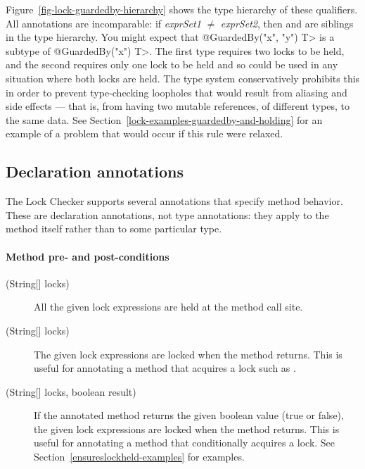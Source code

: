 Figure~\ref{fig-lock-guardedby-hierarchy} shows the type hierarchy of these
qualifiers.
All  annotations are incomparable:
if \emph{exprSet1} $\neq$ \emph{exprSet2}, then  and
 are siblings in the type hierarchy.
You might expect that
\<@GuardedBy({"x", "y"}) T> is a subtype of \<@GuardedBy({"x"}) T>.  The
first type requires two locks to be held, and the second requires only one
lock to be held and so could be used in any situation where both locks are
held.  The type system conservatively prohibits this in order to prevent
type-checking loopholes that would result from aliasing and side effects
--- that is, from having two mutable references, of different types, to the
same data. See
Section~\ref{lock-examples-guardedby-and-holding} for an example
of a problem that would occur if this rule were relaxed.


\subsection{Declaration annotations\label{lock-declaration-annotations}}

The Lock Checker supports several annotations that specify method behavior.
These are declaration annotations, not type annotations: they apply to the
method itself rather than to some particular type.

\paragraph{Method pre- and post-conditions}

\begin{description}
\item[\small{(String[] locks)}]
  All the given lock expressions
  are held at the method call site.

\item[\small{(String[] locks)}]
  The given lock
  expressions are
  locked when the method returns.  This is useful for annotating a
  method that acquires a lock such as
  .

\item[\small{(String[] locks, boolean result)}]
  If the annotated method returns the given
  boolean value (true or false), the given lock
  expressions are locked when the method returns.
  This is useful for annotating a
  method that conditionally acquires a lock.
  See Section~\ref{ensureslockheld-examples} for examples.

\end{description}


